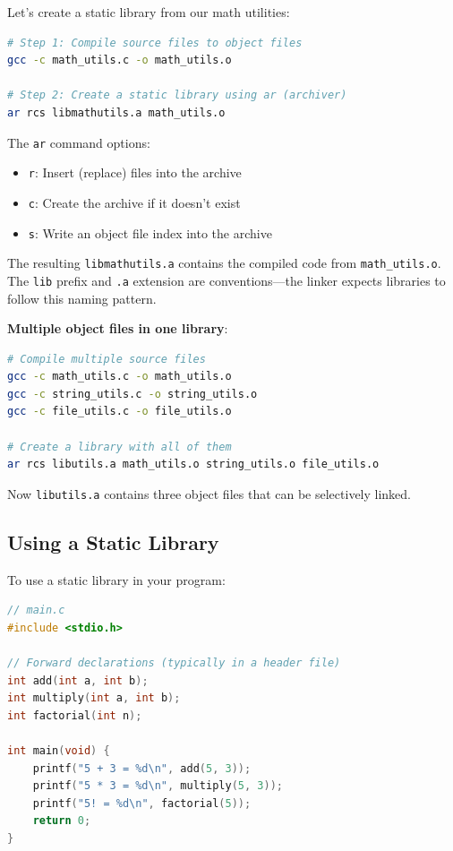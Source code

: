 Let's create a static library from our math utilities:

\begin{lstlisting}[language=bash]
# Step 1: Compile source files to object files
gcc -c math_utils.c -o math_utils.o

# Step 2: Create a static library using ar (archiver)
ar rcs libmathutils.a math_utils.o
\end{lstlisting}

The \texttt{ar} command options:
\begin{itemize}
    \item \texttt{r}: Insert (replace) files into the archive
    \item \texttt{c}: Create the archive if it doesn't exist
    \item \texttt{s}: Write an object file index into the archive
\end{itemize}

The resulting \texttt{libmathutils.a} contains the compiled code from \texttt{math\_utils.o}. The \texttt{lib} prefix and \texttt{.a} extension are conventions—the linker expects libraries to follow this naming pattern.

\textbf{Multiple object files in one library}:

\begin{lstlisting}[language=bash]
# Compile multiple source files
gcc -c math_utils.c -o math_utils.o
gcc -c string_utils.c -o string_utils.o
gcc -c file_utils.c -o file_utils.o

# Create a library with all of them
ar rcs libutils.a math_utils.o string_utils.o file_utils.o
\end{lstlisting}

Now \texttt{libutils.a} contains three object files that can be selectively linked.

\subsection{Using a Static Library}

To use a static library in your program:

\begin{lstlisting}[language=C]
// main.c
#include <stdio.h>

// Forward declarations (typically in a header file)
int add(int a, int b);
int multiply(int a, int b);
int factorial(int n);

int main(void) {
    printf("5 + 3 = %d\n", add(5, 3));
    printf("5 * 3 = %d\n", multiply(5, 3));
    printf("5! = %d\n", factorial(5));
    return 0;
}
\end{lstlisting}

